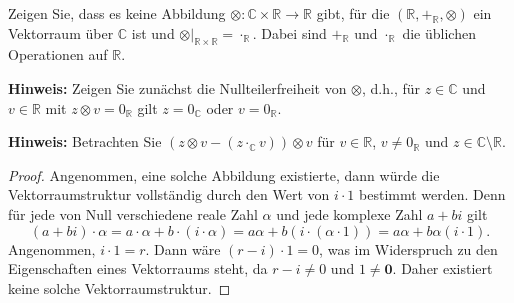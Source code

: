 \documentclass{../problemset}
\begin{document}
\begin{problem}
Zeigen Sie, dass es keine Abbildung $\otimes: \mathbb{C} \times \mathbb{R} \to \mathbb{R}$ gibt, für die $(\mathbb{R}, +_{\mathbb{R}}, \otimes)$ ein Vektorraum über $\mathbb{C}$ ist und $\otimes|_{\mathbb{R} \times \mathbb{R}} = \cdot_{\mathbb{R}}$. Dabei sind $+_{\mathbb{R}}$ und $\cdot_{\mathbb{R}}$ die üblichen Operationen auf $\mathbb{R}$.

\textbf{Hinweis:} Zeigen Sie zunächst die Nullteilerfreiheit von $\otimes$, d.h., für $z \in \mathbb{C}$ und $v \in \mathbb{R}$ mit $z \otimes v = 0_{\mathbb{R}}$ gilt $z = 0_{\mathbb{C}}$ oder $v = 0_{\mathbb{R}}$.

\textbf{Hinweis:} Betrachten Sie $(z \otimes v - (z \cdot_{\mathbb{C}} v)) \otimes v$ für $v \in \mathbb{R}$, $v \neq 0_{\mathbb{R}}$ und $z \in \mathbb{C} \setminus \mathbb{R}$.

\begin{proof}
	Angenommen, eine solche Abbildung existierte, dann würde die Vektorraumstruktur vollständig durch den Wert von \(i \cdot 1\) bestimmt werden. Denn für jede von Null verschiedene reale Zahl \(\alpha\) und jede komplexe Zahl \(a+bi\) gilt
	\[
		(a+bi) \cdot \alpha = a \cdot \alpha + b \cdot (i \cdot \alpha) = a \alpha + b(i \cdot (\alpha \cdot 1)) = a \alpha + b \alpha (i \cdot 1).
	\]
	Angenommen, \(i \cdot 1 = r\). Dann wäre \((r-i) \cdot 1 = 0\), was im Widerspruch zu den Eigenschaften eines Vektorraums steht, da \(r-i \neq 0\) und \(1 \neq \mathbf{0}\). Daher existiert keine solche Vektorraumstruktur.
\end{proof}
\end{problem}


\pagebreak
\end{document}
